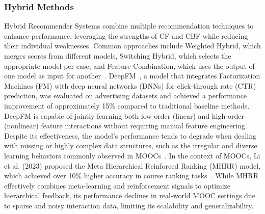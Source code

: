 \documentclass{ieeeaccess}
\begin{document}
\subsubsection{Hybrid Methods}
Hybrid Recommender Systems combine multiple recommendation techniques to enhance performance, leveraging the strengths of CF and CBF while reducing their individual weaknesses. Common approaches include Weighted Hybrid, which merges scores from different models, Switching Hybrid, which selects the appropriate model per case, and Feature Combination, which uses the output of one model as input for another~\cite{aggarwal2016recommender}. DeepFM~\cite{guo2017deepfm}, a model that integrates Factorization Machines (FM) with deep neural networks (DNNs) for click-through rate (CTR) prediction, was evaluated on advertising datasets and achieved a performance improvement of approximately 15\% compared to traditional baseline methods. DeepFM is capable of jointly learning both low-order (linear) and high-order (nonlinear) feature interactions without requiring manual feature engineering. Despite its effectiveness, the model's performance tends to degrade when dealing with missing or highly complex data structures, such as the irregular and diverse learning behaviors commonly observed in MOOCs~\cite{yu2021mooccubex}. In the context of MOOCs, Li et al. (2023) proposed the Meta Hierarchical Reinforced Ranking (MHRR) model, which achieved over 10\% higher accuracy in course ranking tasks~\cite{li2023mhrr}. While MHRR effectively combines meta-learning and reinforcement signals to optimize hierarchical feedback, its performance declines in real-world MOOC settings due to sparse and noisy interaction data, limiting its scalability and generalizability.
\end{document}
